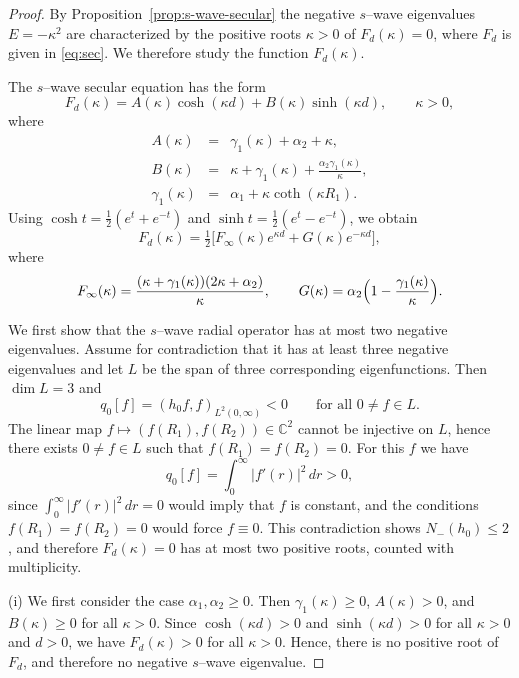 \documentclass[10pt,a4paper]{amsart}
\begin{document}
\begin{proof}
By Proposition~\ref{prop:s-wave-secular} the negative $s$--wave eigenvalues
$E=-\kappa^2$ are characterized by the positive roots $\kappa>0$ of
$F_d(\kappa)=0$, where $F_d$ is given in \eqref{eq:sec}.
We therefore study the function $F_d(\kappa)$.

The $s$--wave secular equation has the form
$$
F_d(\kappa)
=
A(\kappa)\cosh(\kappa d)+B(\kappa)\sinh(\kappa d),
\qquad \kappa>0,
$$
where
\begin{eqnarray*}
A(\kappa)&=&\gamma_1(\kappa)+\alpha_2+\kappa,\\
B(\kappa)&=&\kappa+\gamma_1(\kappa)+\frac{\alpha_2\gamma_1(\kappa)}{\kappa},\\
\gamma_1(\kappa)&=&\alpha_1+\kappa\coth(\kappa R_1).
\end{eqnarray*}
Using $\cosh t=\tfrac12(e^t+e^{-t})$ and $\sinh t=\tfrac12(e^t-e^{-t})$, we obtain
\begin{equation}\label{eq:Fd-split-new}
F_d(\kappa)=\tfrac12\bigl[F_\infty(\kappa)e^{\kappa d}+G(\kappa)e^{-\kappa d}\bigr],
\end{equation}
where
\begin{equation}\label{eq:Finfty-G}
F_\infty(\kappa)=\frac{(\kappa+\gamma_1(\kappa))(2\kappa+\alpha_2)}{\kappa},\qquad
G(\kappa)=\alpha_2\Bigl(1-\frac{\gamma_1(\kappa)}{\kappa}\Bigr).
\end{equation}

\smallskip
\noindent
We first show that the $s$--wave radial operator has at most two negative
eigenvalues.
Assume for contradiction that it has at least three negative eigenvalues and
let $L$ be the span of three corresponding eigenfunctions.
Then $\dim L=3$ and
$$
q_0[f]=(h_0f,f)_{L^2(0,\infty)}<0\qquad \text{for all }0\ne f\in L.
$$
The linear map $f\mapsto (f(R_1),f(R_2))\in\mathbb C^2$ cannot be injective on
$L$, hence there exists $0\ne f\in L$ such that $f(R_1)=f(R_2)=0$.
For this $f$ we have
$$
q_0[f]=\int_0^\infty |f'(r)|^2\,dr>0,
$$
since $\int_0^\infty |f'(r)|^2\,dr=0$ would imply that $f$ is constant, and the
conditions $f(R_1)=f(R_2)=0$ would force $f\equiv0$.
This contradiction shows $N_-(h_0)\le2$, and therefore $F_d(\kappa)=0$ has at
most two positive roots, counted with multiplicity.

\smallskip
\noindent
(i) We first consider the case $\alpha_1,\alpha_2\ge0$.
Then $\gamma_1(\kappa)\ge0$, $A(\kappa)>0$, and $B(\kappa)\ge0$ for all
$\kappa>0$.
Since $\cosh(\kappa d)>0$ and $\sinh(\kappa d)>0$ for all $\kappa>0$ and $d>0$,
we have $F_d(\kappa)>0$ for all $\kappa>0$.
Hence, there is no positive root of $F_d$, and therefore no negative $s$--wave
eigenvalue.


\end{proof}
\end{document}
